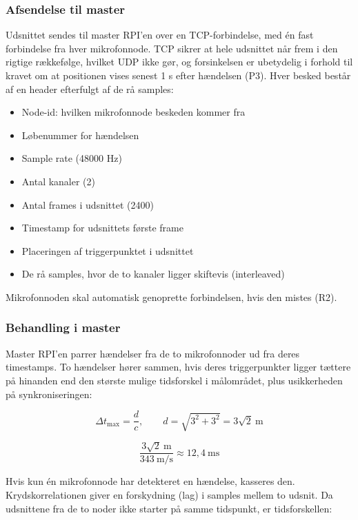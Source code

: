 \documentclass[
  danish,
]{article}
\begin{document}
\subsubsection{Afsendelse til master}\label{afsendelse-til-master}

Udsnittet sendes til master RPI'en over en TCP-forbindelse, med én fast
forbindelse fra hver mikrofonnode. TCP sikrer at hele udsnittet når frem
i den rigtige rækkefølge, hvilket UDP ikke gør, og forsinkelsen er
ubetydelig i forhold til kravet om at positionen vises senest 1 s efter
hændelsen (P3). Hver besked består af en header efterfulgt af de rå
samples:

\begin{itemize}
\item
  Node-id: hvilken mikrofonnode beskeden kommer fra
\item
  Løbenummer for hændelsen
\item
  Sample rate (48000 Hz)
\item
  Antal kanaler (2)
\item
  Antal frames i udsnittet (2400)
\item
  Timestamp for udsnittets første frame
\item
  Placeringen af triggerpunktet i udsnittet
\item
  De rå samples, hvor de to kanaler ligger skiftevis (interleaved)
\end{itemize}

Mikrofonnoden skal automatisk genoprette forbindelsen, hvis den mistes
(R2).

\subsubsection{Behandling i master}\label{behandling-i-master}

Master RPI'en parrer hændelser fra de to mikrofonnoder ud fra deres
timestamps. To hændelser hører sammen, hvis deres triggerpunkter ligger
tættere på hinanden end den største mulige tidsforskel i målområdet,
plus usikkerheden på synkroniseringen:

\[\Delta t_{\max} = \frac{d}{c}, \qquad d = \sqrt{3^{2} + 3^{2}} = 3\sqrt{2}\ \mathrm{m}\]

\[\frac{3\sqrt{2}\ \mathrm{m}}{343\ \mathrm{m/s}} \approx 12{,}4\ \mathrm{ms}\]

Hvis kun én mikrofonnode har detekteret en hændelse, kasseres den.
Krydskorrelationen giver en forskydning (lag) i samples mellem to
udsnit. Da udsnittene fra de to noder ikke starter på samme tidspunkt,
er tidsforskellen:
\end{document}
